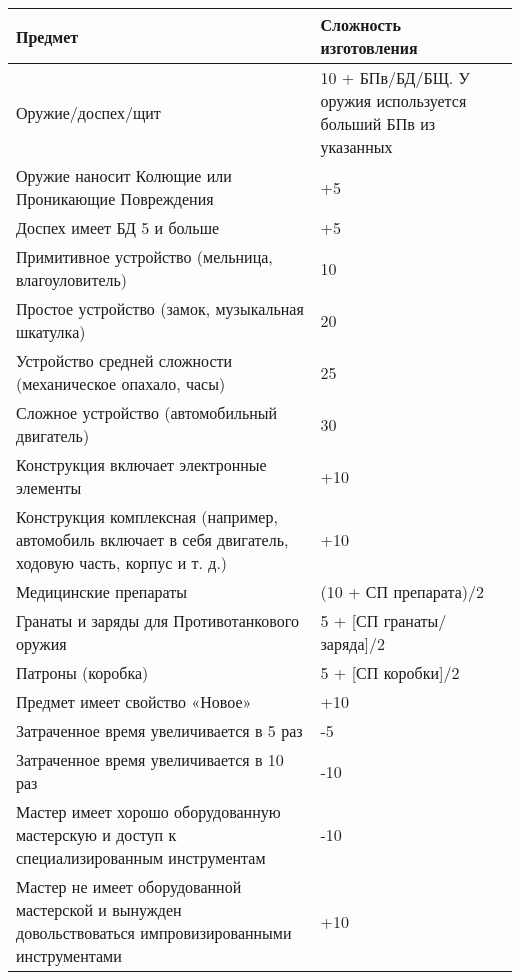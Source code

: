 \begin{center} \begin{tabular}{|p{8cm}|p{6cm}|} \hline
  \textbf{Предмет} & \textbf{Сложность изготовления} \\ \hline
  Оружие/доспех/щит & 10 + БПв/БД/БЩ. У оружия используется больший БПв из указанных \\ \hline
  Оружие наносит Колющие или Проникающие Повреждения & +5 \\ \hline
  Доспех имеет БД 5 и больше & +5 \\ \hline
  Примитивное устройство (мельница, влагоуловитель) & 10 \\ \hline
  Простое устройство (замок, музыкальная шкатулка) & 20 \\ \hline
  Устройство средней сложности (механическое опахало, часы) & 25 \\ \hline
  Сложное устройство (автомобильный двигатель) & 30 \\ \hline
  Конструкция включает электронные элементы & +10 \\ \hline
  Конструкция комплексная (например, автомобиль включает в себя двигатель, ходовую часть, корпус и т. д.) & +10 \\ \hline
  Медицинские препараты & (10 + СП препарата)/2 \\ \hline
  Гранаты и заряды для Противотанкового оружия & 5 + [СП гранаты/заряда]/2 \\ \hline
  Патроны (коробка) & 5 + [СП коробки]/2 \\ \hline
  Предмет имеет свойство «Новое» & +10 \\ \hline
  Затраченное время увеличивается в 5 раз & -5 \\ \hline
  Затраченное время увеличивается в 10 раз & -10 \\ \hline
  Мастер имеет хорошо оборудованную мастерскую и доступ к специализированным инструментам & -10 \\ \hline
  Мастер не имеет оборудованной мастерской и вынужден довольствоваться импровизированными инструментами & +10 \\ \hline
\end{tabular} \end{center}